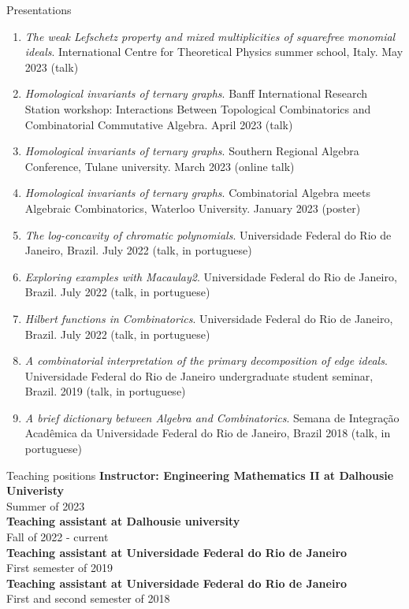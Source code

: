 \documentclass[12pt]{resume} %
\begin{document}
\begin{rSection}{Presentations}
\begin{enumerate}
        \item \textit{The weak Lefschetz property and mixed multiplicities of squarefree monomial ideals}. International Centre for Theoretical Physics summer school, Italy. May 2023 (talk)
        \item \textit{Homological invariants of ternary graphs}. Banff International Research Station workshop: Interactions Between Topological Combinatorics and Combinatorial Commutative Algebra. April 2023 (talk)
        \item \textit{Homological invariants of ternary graphs}. Southern Regional Algebra Conference, Tulane university. March 2023 (online talk)
        \item \textit{Homological invariants of ternary graphs}. Combinatorial Algebra meets Algebraic Combinatorics, Waterloo University. January 2023 (poster)
        \item \textit{The log-concavity of chromatic polynomials}. Universidade Federal do Rio de Janeiro, Brazil. July 2022 (talk, in portuguese)
        \item \textit{Exploring examples with Macaulay2}. Universidade Federal do Rio de Janeiro, Brazil. July 2022 (talk, in portuguese)
        \item \textit{Hilbert functions in Combinatorics}. Universidade Federal do Rio de Janeiro, Brazil. July 2022 (talk, in portuguese)
        \item \textit{A combinatorial interpretation of the primary decomposition of edge ideals}. Universidade Federal do Rio de Janeiro undergraduate student seminar, Brazil. 2019 (talk, in portuguese)
        \item \textit{A brief dictionary between Algebra and Combinatorics}. Semana de Integração Acadêmica da Universidade Federal do Rio de Janeiro, Brazil 2018 (talk, in portuguese)
    \end{enumerate}
\end{rSection}


\begin{rSection}{Teaching positions}
    {\bf Instructor: Engineering Mathematics II at Dalhousie Univeristy}
    \\
    Summer of 2023
    \\
    {\bf Teaching assistant at Dalhousie university}
    \\
    Fall of 2022 - current
    \\
    {\bf Teaching assistant at Universidade Federal do Rio de Janeiro} 
    \\
    First semester of 2019
    \\
    {\bf Teaching assistant at Universidade Federal do Rio de Janeiro} 
    \\
    First and second semester of 2018
    \\
        
\end{rSection}
\end{document}
